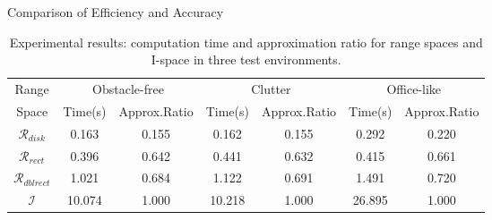 \begin{frame}{Comparison of Efficiency and Accuracy}
\begin{table}
  \scriptsize\centering
    \begin{tabular}{ccccccc} 
    \hline
    Range & \multicolumn{2}{c}{Obstacle-free} & \multicolumn{2}{c}{Clutter} & \multicolumn{2}{c}{Office-like}\\
    Space & Time(s) &Approx.Ratio& Time(s) &Approx.Ratio& Time(s) &Approx.Ratio \\
    \hline
    $\mathcal{R}_{disk}$ & 0.163 & 0.155 & 0.162 & 0.155  & 0.292 & 0.220 \\ 
    \hline
    $\mathcal{R}_{rect}$ & 0.396 & 0.642  & 0.441 & 0.632 & 0.415 & 0.661 \\
    \hline
    $\mathcal{R}_{dblrect}$ & 1.021 & 0.684 & 1.122 & 0.691 & 1.491 & 0.720 \\
    \hline
    $\mathcal{I}$ & 10.074 & 1.000 & 10.218 & 1.000 & 26.895 & 1.000 \\
    \hline
    \end{tabular}
    \caption{Experimental results: computation time and approximation
      ratio for range spaces and I-space in three test environments.}
    \label{tab:exp-data}
\end{table}
\end{frame}


